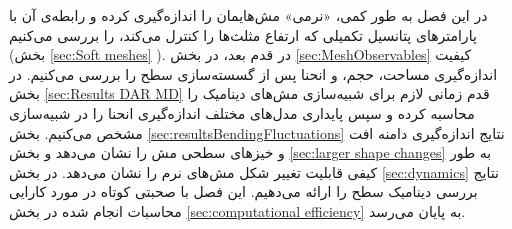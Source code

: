 در این فصل به طور کمی، «نرمی‌» مش‌هایمان را اندازه‌گیری کرده و رابطه‌ی آن با پارامتر‌های پتانسیل‌ تکمیلی که ارتفاع مثلث‌ها را کنترل می‌کند، را بررسی می‌کنیم (بخش
\ref{sec:Soft meshes}
). در قدم بعد، در بخش 
\ref{sec:MeshObservables}
کیفیت اندازه‌گیری مساحت، حجم، و انحنا پس از گسسته‌سازی سطح را بررسی می‌کنیم. در بخش
\ref{sec:Results DAR MD}
قدم زمانی لازم برای شبیه‌سازی مش‌های دینامیک را محاسبه کرده و سپس پایداری مدل‌های مختلف اندازه‌گیری انحنا را در شبیه‌سازی مشخص می‌کنیم. بخش 
\ref{sec:resultsBendingFluctuations}  
نتایج اندازه‌گیری دامنه افت و خیزهای سطحی مش را نشان می‌دهد و بخش 
\ref{sec:larger shape changes}
به طور کیفی قابلیت تغییر شکل مش‌های نرم را نشان می‌دهد. در بخش
\ref{sec:dynamics}
نتایج بررسی دینامیک سطح را ارائه می‌دهیم. این فصل با صحبتی کوتاه در مورد کارایی محاسبات انجام شده در بخش
\ref{sec:computational efficiency}
به پایان می‌رسد.